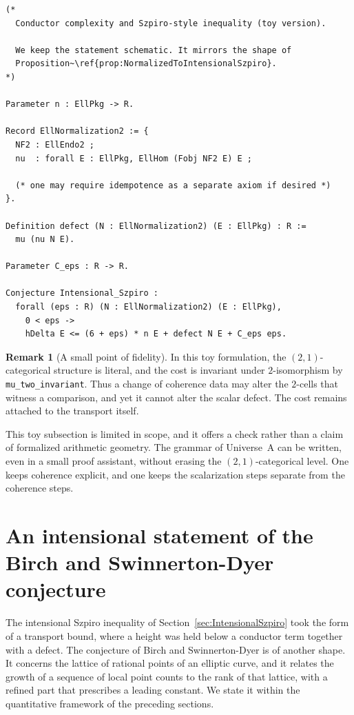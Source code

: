\documentclass[10pt, reqno]{amsart}
\theoremstyle{plain}
\theoremstyle{definition}
\newtheorem{remark}[theorem]{Remark}
\theoremstyle{plain}
\begin{document}
\begin{scriptsize}
\begin{verbatim}
(*
  Conductor complexity and Szpiro-style inequality (toy version).

  We keep the statement schematic. It mirrors the shape of
  Proposition~\ref{prop:NormalizedToIntensionalSzpiro}.
*)

Parameter n : EllPkg -> R.

Record EllNormalization2 := {
  NF2 : EllEndo2 ;
  nu  : forall E : EllPkg, EllHom (Fobj NF2 E) E ;

  (* one may require idempotence as a separate axiom if desired *)
}.

Definition defect (N : EllNormalization2) (E : EllPkg) : R :=
  mu (nu N E).

Parameter C_eps : R -> R.

Conjecture Intensional_Szpiro :
  forall (eps : R) (N : EllNormalization2) (E : EllPkg),
    0 < eps ->
    hDelta E <= (6 + eps) * n E + defect N E + C_eps eps.
\end{verbatim}
\end{scriptsize}

\begin{remark}[A small point of fidelity]\label{rem:CoqFidelity}
In this toy formulation, the $(2,1)$-categorical structure is literal, and the cost is invariant under $2$-isomorphism by \texttt{mu\_two\_invariant}. Thus a change of coherence data may alter the $2$-cells that witness a comparison, and yet it cannot alter the scalar defect. The cost remains attached to the transport itself.
\end{remark}

This toy subsection is limited in scope, and it offers a check rather than a claim of formalized arithmetic geometry. The grammar of Universe~A can be written, even in a small proof assistant, without erasing the $(2,1)$-categorical level. One keeps coherence explicit, and one keeps the scalarization steps separate from the coherence steps.



\section{An intensional statement of the Birch and Swinnerton-Dyer
conjecture}\label{sec:BSD}

The intensional Szpiro inequality of Section~\ref{sec:IntensionalSzpiro} took the form of a transport bound, where a height was held below a conductor term together with a defect. The conjecture of Birch and Swinnerton-Dyer is of another shape. It concerns the lattice of rational points of an elliptic curve, and it relates the growth of a sequence of local point counts to the rank of that lattice, with a refined part that prescribes a leading constant. We state it within the quantitative framework of the preceding sections.
\end{document}
